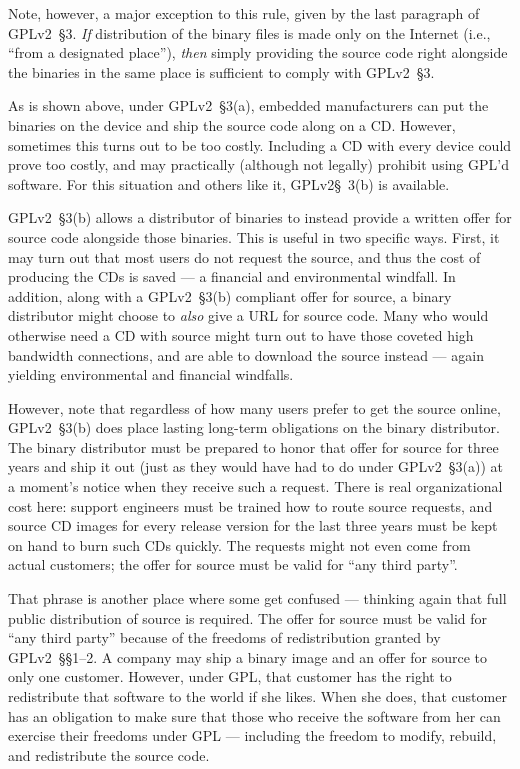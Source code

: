 Note, however, a major exception to this rule, given by the last paragraph
of GPLv2~\S3. \emph{If} distribution of the binary files is made only on the
Internet (i.e., ``from a designated place''), \emph{then} simply providing
the source code right alongside the binaries in the same place is
sufficient to comply with GPLv2~\S3.

\medskip

As is shown above, under GPLv2~\S3(a), embedded manufacturers can put the
binaries on the device and ship the source code along on a CD\@.  However,
sometimes this turns out to be too costly.  Including a CD with every
device could prove too costly, and may practically (although not legally)
prohibit using GPL'd software. For this situation and others like it, GPLv2\S~3(b) is available.

\label{GPLv2s3b}
GPLv2~\S3(b) allows a distributor of binaries to instead provide a written
offer for source code alongside those binaries.  This is useful in two
specific ways.  First, it may turn out that most users do not request the
source, and thus the cost of producing the CDs is saved --- a financial
and environmental windfall.  In addition, along with a GPLv2~\S3(b) compliant
offer for source, a binary distributor might choose to \emph{also} give a
URL for source code.  Many who would otherwise need a CD with source might
turn out to have those coveted high bandwidth connections, and are able to
download the source instead --- again yielding environmental and financial
windfalls.

However, note that regardless of how many users prefer to get the
source online, GPLv2~\S3(b) does place lasting long-term obligations on the
binary distributor.  The binary distributor must be prepared to honor
that offer for source for three years and ship it out (just as they
would have had to do under GPLv2~\S3(a)) at a moment's notice when they
receive such a request.  There is real organizational cost here:
support engineers must be trained how to route source requests, and
source CD images for every release version for the last three years
must be kept on hand to burn such CDs quickly. The requests might not
even come from actual customers; the offer for source must be valid
for ``any third party''.

That phrase is another place where some get confused --- thinking again
that full public distribution of source is required.  The offer for source
must be valid for ``any third party'' because of the freedoms of
redistribution granted by GPLv2~\S\S1--2.  A company may ship a binary image
and an offer for source to only one customer.  However, under GPL, that
customer has the right to redistribute that software to the world if she
likes.  When she does, that customer has an obligation to make sure that
those who receive the software from her can exercise their freedoms under
GPL --- including the freedom to modify, rebuild, and redistribute the
source code.


